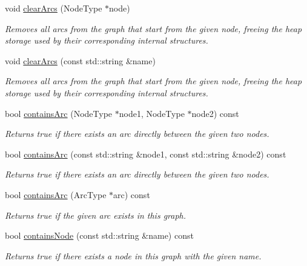 \begin{DoxyCompactItemize}
void \mbox{\hyperlink{classGraph_a14def9e68896088fec7839e5da4fed27}{clear\+Arcs}} (Node\+Type $\ast$node)
\begin{DoxyCompactList}\small\item\em Removes all arcs from the graph that start from the given node, freeing the heap storage used by their corresponding internal structures. \end{DoxyCompactList}\item 
void \mbox{\hyperlink{classGraph_a2d8ecb9c6768fff244b2be46319385cc}{clear\+Arcs}} (const std\+::string \&name)
\begin{DoxyCompactList}\small\item\em Removes all arcs from the graph that start from the given node, freeing the heap storage used by their corresponding internal structures. \end{DoxyCompactList}\item 
bool \mbox{\hyperlink{classGraph_a9ca50139471975b82fdc6b1977bcfa4a}{contains\+Arc}} (Node\+Type $\ast$node1, Node\+Type $\ast$node2) const
\begin{DoxyCompactList}\small\item\em Returns true if there exists an arc directly between the given two nodes. \end{DoxyCompactList}\item 
bool \mbox{\hyperlink{classGraph_a515e45aae316b581bf1cf168541f4f44}{contains\+Arc}} (const std\+::string \&node1, const std\+::string \&node2) const
\begin{DoxyCompactList}\small\item\em Returns true if there exists an arc directly between the given two nodes. \end{DoxyCompactList}\item 
bool \mbox{\hyperlink{classGraph_acf7a659ddd8a143836b91b01c200ee8a}{contains\+Arc}} (Arc\+Type $\ast$arc) const
\begin{DoxyCompactList}\small\item\em Returns true if the given arc exists in this graph. \end{DoxyCompactList}\item 
bool \mbox{\hyperlink{classGraph_ac0beb77e8a238c2898ab851df71eeefe}{contains\+Node}} (const std\+::string \&name) const
\begin{DoxyCompactList}\small\item\em Returns true if there exists a node in this graph with the given name. \end{DoxyCompactList}\item 

\end{DoxyCompactItemize}
